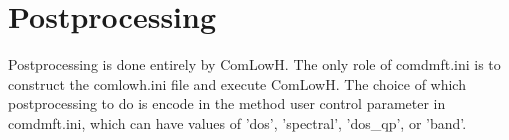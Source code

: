 \documentclass[aps,prb,singlecolumn,preprintnumbers,amsmath,amssymb]{revtex4}
\begin{document}
%
%

\section{Postprocessing}
Postprocessing is done entirely by ComLowH.  The only role of comdmft.ini is to construct the comlowh.ini file and execute ComLowH.  The choice of which postprocessing to do is encode in the method user control parameter in comdmft.ini, which can have values of 'dos', 'spectral', 'dos\_qp', or 'band'.
\end{document}
